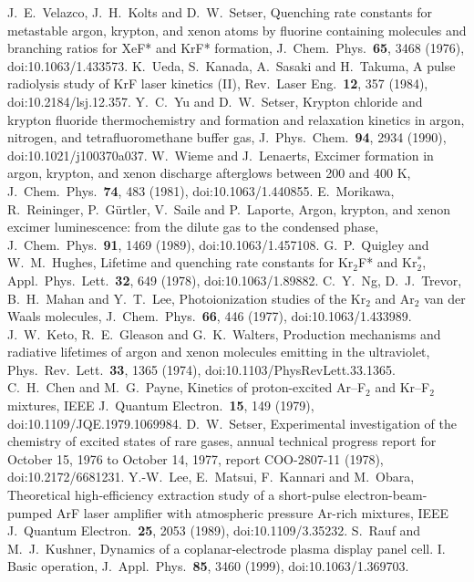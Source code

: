  J.~E.~Velazco, J.~H.~Kolts and D.~W.~Setser, Quenching rate constants for metastable argon, krypton, and xenon atoms by fluorine containing molecules and branching ratios for XeF* and KrF* formation, J.~Chem.\ Phys.\ \textbf{65}, 3468 (1976), doi:10.1063/1.433573.
 K.~Ueda, S.~Kanada, A.~Sasaki and H.~Takuma, A pulse radiolysis study of KrF laser kinetics (II), Rev.\ Laser Eng.\ \textbf{12}, 357 (1984), doi:10.2184/lsj.12.357.
 Y.~C.~Yu and D.~W.~Setser, Krypton chloride and krypton fluoride thermochemistry and formation and relaxation kinetics in argon, nitrogen, and tetrafluoromethane buffer gas, J.~Phys.\ Chem.\ \textbf{94}, 2934 (1990), doi:10.1021/j100370a037.
 W.~Wieme and J.~Lenaerts, Excimer formation in argon, krypton, and xenon discharge afterglows between 200 and 400 K, J.~Chem.\ Phys.\ \textbf{74}, 483 (1981), doi:10.1063/1.440855.
 E.~Morikawa, R.~Reininger, P.~G\"{u}rtler, V.~Saile and P.~Laporte, Argon, krypton, and xenon excimer luminescence: from the dilute gas to the condensed phase, J.~Chem.\ Phys.\ \textbf{91}, 1469 (1989), doi:10.1063/1.457108.
 G.~P.~Quigley and W.~M.~Hughes, Lifetime and quenching rate constants for Kr$_2$F* and Kr$_2^*$, Appl.\ Phys.\ Lett.\ \textbf{32}, 649 (1978), doi:10.1063/1.89882.
 C.~Y.~Ng, D.~J.~Trevor, B.~H.~Mahan and Y.~T.~Lee, Photoionization studies of the Kr$_2$ and Ar$_2$ van der Waals molecules, J.~Chem.\ Phys.\ \textbf{66}, 446 (1977), doi:10.1063/1.433989.
 J.~W.~Keto, R.~E.~Gleason and G.~K.~Walters, Production mechanisms and radiative lifetimes of argon and xenon molecules emitting in the ultraviolet, Phys.\ Rev.\ Lett.\ \textbf{33}, 1365 (1974), doi:10.1103/PhysRevLett.33.1365.
 C.~H.~Chen and M.~G.~Payne, Kinetics of proton-excited Ar--F$_2$ and Kr--F$_2$ mixtures, IEEE J.~Quantum Electron.\ \textbf{15}, 149 (1979), doi:10.1109/JQE.1979.1069984.
 D.~W.~Setser, Experimental investigation of the chemistry of excited states of rare gases, annual technical progress report for October 15, 1976 to October 14, 1977, report COO-2807-11 (1978), doi:10.2172/6681231.
 Y.-W.~Lee, E.~Matsui, F.~Kannari and M.~Obara, Theoretical high-efficiency extraction study of a short-pulse electron-beam-pumped ArF laser amplifier with atmospheric pressure Ar-rich mixtures, IEEE J.~Quantum Electron.\ \textbf{25}, 2053 (1989), doi:10.1109/3.35232.
 S.~Rauf and M.~J.~Kushner, Dynamics of a coplanar-electrode plasma display panel cell. I. Basic operation, J.~Appl.\ Phys.\ \textbf{85}, 3460 (1999), doi:10.1063/1.369703.
